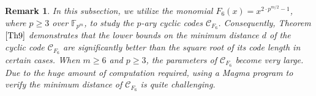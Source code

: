 \documentclass[pdflatex,sn-mathphys-num]{sn-jnl}%
\theoremstyle{thmstyleone}%
\theoremstyle{thmstyletwo}%
\newtheorem{remark}{Remark}%
\theoremstyle{thmstylethree}%
\begin{document}
\vspace{1em}
\begin{remark}
    In this subsection, we utilize the monomial $F_{6}(x)=x^{2\cdot p^{m/2}-1}$, where $p\geq 3$ over $\mathbb{F}_{p^m}$, to study the $p$-ary cyclic codes $\mathcal{C}_{F_{6}}$. Consequently, Theorem $\ref{Th9}$ demonstrates that the lower bounds on the minimum distance $d$ of the cyclic code $\mathcal{C}_{F_{6}}$ are significantly better than the square root of its code length in certain cases. When $m\geq 6$ and $p\geq 3$, the parameters of $\mathcal{C}_{F_{6}}$ become very large. Due to the huge amount of computation required, using a Magma program to verify the minimum distance of $\mathcal{C}_{F_{6}}$ is quite challenging. %
\end{remark}
\end{document}
